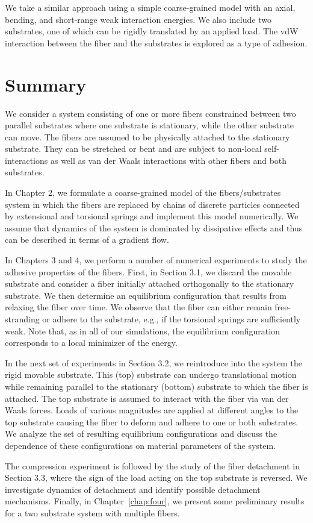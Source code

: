 	We take a similar approach using a simple coarse-grained model with an axial, bending, and short-range weak interaction energies. We also include two substrates, one of which can be rigidly translated by an applied load. The vdW interaction between the fiber and the substrates is explored as a type of adhesion.
	
\section{Summary}

We consider a system consisting of one or more fibers constrained between two parallel substrates where one substrate is stationary, while the other substrate can move. 
The fibers are assumed to be physically attached to the stationary substrate. 
They can be stretched or bent and are subject to non-local self-interactions as well as van der Waals interactions with other fibers and both substrates. 

In Chapter 2, we formulate a coarse-grained model of the fibers/substrates system in which the fibers are replaced by chains of discrete particles connected by extensional and torsional springs and implement this model numerically. 
We assume that dynamics of the system is dominated by dissipative effects and thus can be described in terms of a gradient flow. 

In Chapters 3 and 4, we perform a number of numerical experiments to study the adhesive properties of the fibers. 
First, in Section 3.1, we discard the movable substrate and consider a fiber initially attached orthogonally to the stationary substrate. 
We then determine an equilibrium configuration that results from relaxing the fiber over time. 
We observe that the fiber can either remain free-stranding or adhere to the substrate, e.g., if the torsional springs are sufficiently weak. 
Note that, as in all of our simulations, the equilibrium configuration corresponds to a local minimizer of the energy.

In the next set of experiments in Section 3.2, we reintroduce into the system the rigid movable substrate. 
This (top) substrate can undergo translational motion while remaining parallel to the stationary (bottom) substrate to which the fiber is attached. 
The top substrate is assumed to interact with the fiber via van der Waals forces. Loads of various magnitudes are applied at different angles to the top substrate causing the fiber to deform and adhere to one or both substrates. 
We analyze the set of resulting equilibrium configurations and discuss the dependence of these configurations on material parameters of the system.

The compression experiment is followed by the study of the fiber detachment in Section 3.3, where the sign of the load acting on the top substrate is reversed. 
We investigate dynamics of detachment and identify possible detachment mechanisms. 
Finally, in Chapter~\ref{chap:four}, we present some preliminary results for a two substrate system with multiple fibers.